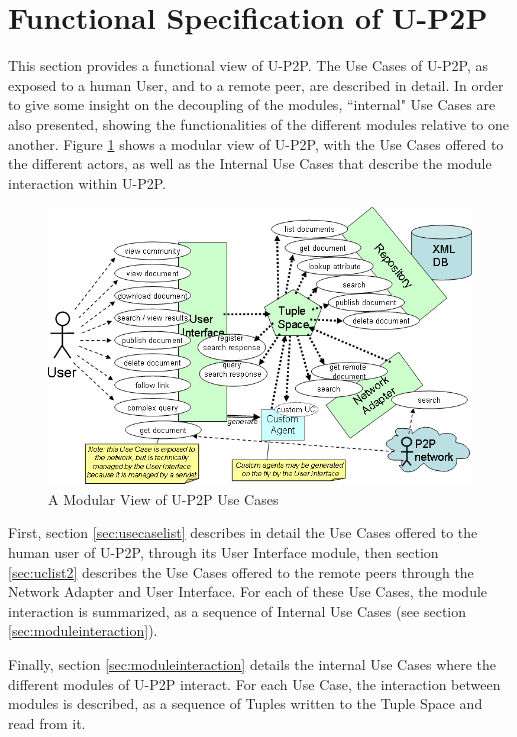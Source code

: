 \documentclass[titlepage]{article}%
\begin{document}
\section{Functional Specification of U-P2P}
\label{sec:functionalspec}

This section provides a functional view of U-P2P. 
The Use Cases of U-P2P, as exposed to a human User, and to a remote peer, are described in detail. In order to give some insight on the decoupling of the modules, ``internal" Use Cases are also presented, showing the functionalities of the different modules relative to one another.
Figure \ref{fig:UseCases} shows a modular view of U-P2P, with the Use Cases offered to the different actors, as well as the Internal Use Cases that describe the module interaction within U-P2P.

\begin{figure}[htb]
	\centering
		\includegraphics[scale=0.7]{diagrams/modularUseCaseView.png}
	\caption{A Modular View of U-P2P Use Cases}
	\label{fig:UseCases}
\end{figure}

First, section \ref{sec:usecaselist} describes in detail the Use Cases offered to the human user of U-P2P, through its User Interface module, then  section \ref{sec:uclist2} describes the Use Cases offered to the remote peers through the Network Adapter and User Interface. For each of these Use Cases, the module interaction is summarized, as a sequence of Internal Use Cases (see section \ref{sec:moduleinteraction}).

Finally, section \ref{sec:moduleinteraction} details the internal Use Cases where the different modules of U-P2P interact.
For each Use Case, the interaction between modules is described, as a sequence of Tuples written to the Tuple Space and read from it. 
\end{document}

